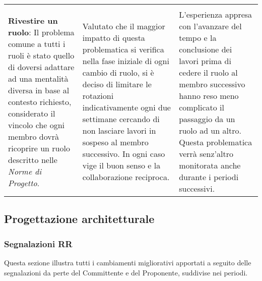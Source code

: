 \begin{longtable}{ 
				>{\centering}p{}
				>{\centering}p{}
				>{\centering\arraybackslash}p{}}
				\multicolumn{3}{c}{Ruoli} \\
				\textbf{Rivestire un ruolo}: Il problema comune a tutti i ruoli è stato quello di doversi adattare ad una mentalità diversa in base al contesto richiesto, considerato il vincolo che ogni membro dovrà ricoprire un ruolo descritto nelle \textit{Norme di Progetto}.
					&
				Valutato che il maggior impatto di questa problematica si verifica nella fase iniziale di ogni cambio di ruolo, si è deciso di limitare le rotazioni indicativamente ogni due settimane cercando di non lasciare lavori in sospeso al membro successivo. In ogni caso vige il buon senso e la collaborazione reciproca.
					&
				L'esperienza appresa con l'avanzare del tempo e la conclusione dei lavori prima di cedere il ruolo al membro successivo hanno reso meno complicato il passaggio da un ruolo ad un altro. Questa problematica verrà senz'altro monitorata anche durante i periodi successivi.
					\\
				
			\end{longtable}
	
	\subsection{Progettazione architetturale}
	
		\subsubsection{Segnalazioni RR}
		Questa sezione illustra tutti i cambiamenti migliorativi apportati a seguito delle segnalazioni da
perte del Committente e del Proponente, suddivise nei periodi.
			

